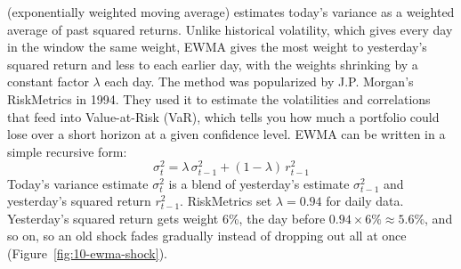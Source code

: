  (exponentially weighted moving average) estimates today's variance as a weighted average of past squared returns. Unlike historical volatility, which gives every day in the window the same weight, EWMA gives the most weight to yesterday's squared return and less to each earlier day, with the weights shrinking by a constant factor $\lambda$ each day. The method was popularized by J.P. Morgan's RiskMetrics in 1994.
They used it to estimate the volatilities and correlations that feed into Value-at-Risk (VaR), which tells you how much a portfolio could lose over a short horizon at a given confidence level.
EWMA can be written in a simple recursive form:
\begin{equation}
  \sigma^2_t = \lambda\,\sigma^2_{t-1} + (1 - \lambda)\,r^2_{t-1}
  \label{eq:10-ewma}
\end{equation}
Today's variance estimate $\sigma^2_t$ is a blend of yesterday's estimate $\sigma^2_{t-1}$ and yesterday's squared return $r^2_{t-1}$.
RiskMetrics set $\lambda = 0.94$ for daily data. Yesterday's squared return gets weight 6\%, the day before $0.94 \times 6\% \approx 5.6\%$, and so on, so an old shock fades gradually instead of dropping out all at once (Figure~\ref{fig:10-ewma-shock}).


